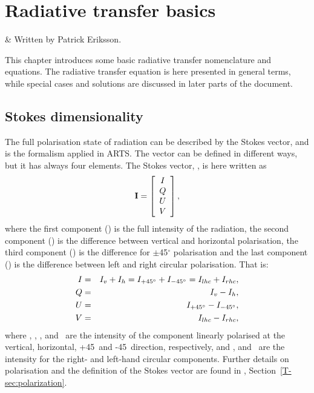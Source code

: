\chapter{Radiative transfer basics}
 \label{sec:rte_basics}

 & Written by Patrick Eriksson.\\
\stophistory

This chapter introduces some basic radiative transfer nomenclature and
equations. The radiative transfer equation is here presented in general terms,
while special cases and solutions are discussed in later parts of the document.



\section{Stokes dimensionality}
\label{sec:fm_defs:polarisation}

The full polarisation state of radiation can be described by the Stokes vector,
and is the formalism applied in ARTS. The vector can be defined in different
ways, but it has always four elements. The Stokes vector, \StoVec, is here
written as
\begin{equation}
  \label{eq:fm_defs:stokevec}
  {\bf I} = \left[
  \begin{array}{c}
   I\\ Q \\ U\\ V
  \end{array}
  \right],
\end{equation}
where the first component (\StoI) is the full intensity of the
radiation, the second component (\StoQ) is the difference between
vertical and horizontal polarisation, the third component (\StoU) is the
difference for $\pm$45$^\circ$ polarisation and the last component
(\StoV) is the difference between left and right circular polarisation.
That is:
\begin{eqnarray}
  I &=&   I_v + I_h = I_{+45^\circ} + I_{-45^\circ} = I_{lhc} + I_{rhc}, \\
  Q &=&   I_v - I_h,                                 \\
  U &=&   I_{+45^\circ} - I_{-45^\circ},                             \\
  V &=&   I_{lhc} - I_{rhc},                             
\end{eqnarray}
where \Iv, \Ih, \Ipff, and \Imff\ are the intensity of the component linearly
polarised at the vertical, horizontal, +45\degree\ and -45\degree\ direction,
respectively, and \Irhc, and \Ilhc\ are the intensity for the right- and
left-hand circular components. Further details on polarisation and the
definition of the Stokes vector are found in \theory,
Section~\ref{T-sec:polarization}.

